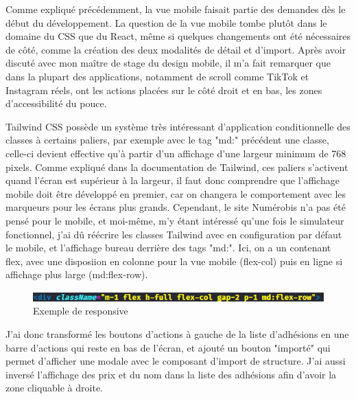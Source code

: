 \documentclass[a4paper,12pt]{report}
\begin{document}
Comme expliqué précédemment, la vue mobile faisait partie des demandes dès le début du développement. La question de la vue mobile tombe plutôt dans le domaine du CSS que du React, même si quelques changements ont été nécessaires de côté, comme la création des deux modalités de détail et d'import. Après avoir discuté avec mon maître de stage du design mobile, il m'a fait remarquer que dans la plupart des applications, notamment de scroll comme TikTok et Instagram réels, ont les actions placées sur le côté droit et en bas, les zones d'accessibilité du pouce.

Tailwind CSS possède un système très intéressant d'application conditionnelle des classes à certains paliers, par exemple avec le tag "md:" précédent une classe, celle-ci devient effective qu'à partir d'un affichage d'une largeur minimum de 768 pixels. Comme expliqué dans la documentation de Tailwind, ces paliers s'activent quand l'écran est supérieur à la largeur, il faut donc comprendre que l'affichage mobile doit être développé en premier, car on changera le comportement avec les marqueurs pour les écrans plus grands. Cependant, le site Numérobis n'a pas été pensé pour le mobile, et moi-même, m'y étant intéressé qu'une fois le simulateur fonctionnel, j'ai dû réécrire les classes Tailwind avec en configuration par défaut le mobile, et l'affichage bureau derrière des tags "md:". Ici, on a un contenant flex, avec une disposiion en colonne pour la vue mobile (flex-col) puis en ligne si affichage plus large (md:flex-row).

\begin{figure}[H]
    \centering
    \includegraphics[scale=0.8]{responsive.png}
    \caption{Exemple de responsive}
    \label{fig:responsive}
\end{figure}

J'ai donc transformé les boutons d'actions à gauche de la liste d'adhésions en une barre d'actions qui reste en bas de l'écran, et ajouté un bouton "importé" qui permet d'afficher une modale avec le composant d'import de structure. J'ai aussi inversé l'affichage des prix et du nom dans la liste des adhésions afin d'avoir la zone cliquable à droite.
\end{document}
